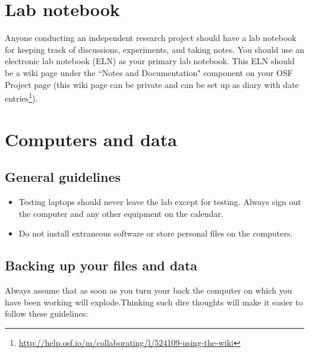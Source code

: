 \documentclass[letterpaper,12pt,oneside]{memoir}
\begin{document}
\section{Lab notebook}
\label{sec:lab_notebook}

Anyone conducting an independent research project should have a lab notebook for keeping track of discussions, experiments, and taking notes. You should use an electronic lab notebook (ELN) as your primary lab notebook. This ELN should be a wiki page under the ``Notes and Documentation" component on your OSF Project page (this wiki page can be private and can be set up as diary with date entries\footnote{\url{http://help.osf.io/m/collaborating/l/524109-using-the-wiki}}).

\section{Computers and data}

\subsection{General guidelines}

\begin{itemize}
\item Testing laptops should never leave the lab except for testing. Always sign out the computer and any other equipment on the calendar.
\item Do not install extraneous software or store personal files on the computers.
\end{itemize}

\subsection{Backing up your files and data}

Always assume that as soon as you turn your back the computer on which you have been working will explode.Thinking such dire thoughts will make it easier to follow these guidelines:
\end{document}
